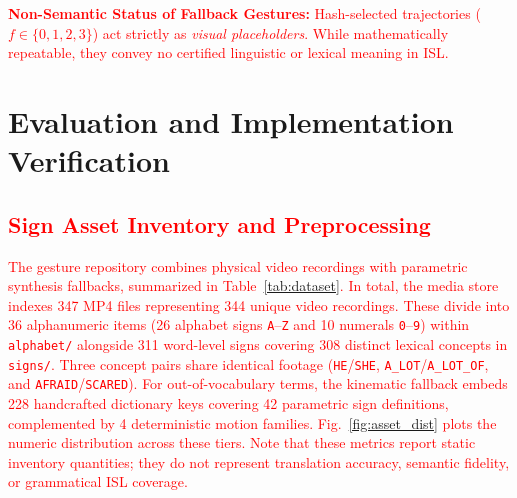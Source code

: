 \documentclass[conference,a4paper,10pt]{IEEEtran}
\begin{document}
\textcolor{red}{\textbf{Non-Semantic Status of Fallback Gestures:} Hash-selected trajectories ($f \in \{0,1,2,3\}$) act strictly as \emph{visual placeholders}. While mathematically repeatable, they convey no certified linguistic or lexical meaning in ISL.}

\section{Evaluation and Implementation Verification}
\label{sec:results}

\subsection{\textcolor{red}{Sign Asset Inventory and Preprocessing}}
\label{subsec:inventory}

\textcolor{red}{The gesture repository combines physical video recordings with parametric synthesis fallbacks, summarized in Table~\ref{tab:dataset}. In total, the media store indexes 347 MP4 files representing 344 unique video recordings. These divide into 36 alphanumeric items (26 alphabet signs \texttt{A}--\texttt{Z} and 10 numerals \texttt{0}--\texttt{9}) within \texttt{alphabet/} alongside 311 word-level signs covering 308 distinct lexical concepts in \texttt{signs/}. Three concept pairs share identical footage (\texttt{HE}/\texttt{SHE}, \texttt{A\_LOT}/\texttt{A\_LOT\_OF}, and \texttt{AFRAID}/\texttt{SCARED}). For out-of-vocabulary terms, the kinematic fallback embeds 228 handcrafted dictionary keys covering 42 parametric sign definitions, complemented by 4 deterministic motion families. Fig.~\ref{fig:asset_dist} plots the numeric distribution across these tiers. Note that these metrics report static inventory quantities; they do not represent translation accuracy, semantic fidelity, or grammatical ISL coverage.}
\end{document}
